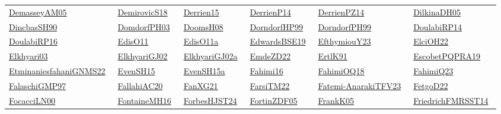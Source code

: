 \begin{longtable}{*{6}{l}}
\href{}{DemasseyAM05}~\cite{DemasseyAM05} & \href{works/DemirovicS18.pdf}{DemirovicS18}~\cite{DemirovicS18} & \href{works/Derrien15.pdf}{Derrien15}~\cite{Derrien15} & \href{works/DerrienP14.pdf}{DerrienP14}~\cite{DerrienP14} & \href{works/DerrienPZ14.pdf}{DerrienPZ14}~\cite{DerrienPZ14} & \href{works/DilkinaDH05.pdf}{DilkinaDH05}~\cite{DilkinaDH05}\\ 
\href{works/DincbasSH90.pdf}{DincbasSH90}~\cite{DincbasSH90} & \href{}{DomdorfPH03}~\cite{DomdorfPH03} & \href{works/DoomsH08.pdf}{DoomsH08}~\cite{DoomsH08} & \href{}{DorndorfHP99}~\cite{DorndorfHP99} & \href{}{DorndorfPH99}~\cite{DorndorfPH99} & \href{works/DoulabiRP14.pdf}{DoulabiRP14}~\cite{DoulabiRP14}\\ 
\href{works/DoulabiRP16.pdf}{DoulabiRP16}~\cite{DoulabiRP16} & \href{works/EdisO11.pdf}{EdisO11}~\cite{EdisO11} & \href{}{EdisO11a}~\cite{EdisO11a} & \href{}{EdwardsBSE19}~\cite{EdwardsBSE19} & \href{works/EfthymiouY23.pdf}{EfthymiouY23}~\cite{EfthymiouY23} & \href{}{ElciOH22}~\cite{ElciOH22}\\ 
\href{works/Elkhyari03.pdf}{Elkhyari03}~\cite{Elkhyari03} & \href{works/ElkhyariGJ02.pdf}{ElkhyariGJ02}~\cite{ElkhyariGJ02} & \href{works/ElkhyariGJ02a.pdf}{ElkhyariGJ02a}~\cite{ElkhyariGJ02a} & \href{works/EmdeZD22.pdf}{EmdeZD22}~\cite{EmdeZD22} & \href{works/ErtlK91.pdf}{ErtlK91}~\cite{ErtlK91} & \href{works/EscobetPQPRA19.pdf}{EscobetPQPRA19}~\cite{EscobetPQPRA19}\\ 
\href{works/EtminaniesfahaniGNMS22.pdf}{EtminaniesfahaniGNMS22}~\cite{EtminaniesfahaniGNMS22} & \href{works/EvenSH15.pdf}{EvenSH15}~\cite{EvenSH15} & \href{works/EvenSH15a.pdf}{EvenSH15a}~\cite{EvenSH15a} & \href{works/Fahimi16.pdf}{Fahimi16}~\cite{Fahimi16} & \href{works/FahimiOQ18.pdf}{FahimiOQ18}~\cite{FahimiOQ18} & \href{}{FahimiQ23}~\cite{FahimiQ23}\\ 
\href{works/FalaschiGMP97.pdf}{FalaschiGMP97}~\cite{FalaschiGMP97} & \href{works/FallahiAC20.pdf}{FallahiAC20}~\cite{FallahiAC20} & \href{works/FanXG21.pdf}{FanXG21}~\cite{FanXG21} & \href{works/FarsiTM22.pdf}{FarsiTM22}~\cite{FarsiTM22} & \href{}{Fatemi-AnarakiTFV23}~\cite{Fatemi-AnarakiTFV23} & \href{works/FetgoD22.pdf}{FetgoD22}~\cite{FetgoD22}\\ 
\href{works/FocacciLN00.pdf}{FocacciLN00}~\cite{FocacciLN00} & \href{works/FontaineMH16.pdf}{FontaineMH16}~\cite{FontaineMH16} & \href{works/ForbesHJST24.pdf}{ForbesHJST24}~\cite{ForbesHJST24} & \href{works/FortinZDF05.pdf}{FortinZDF05}~\cite{FortinZDF05} & \href{works/FrankK05.pdf}{FrankK05}~\cite{FrankK05} & \href{}{FriedrichFMRSST14}~\cite{FriedrichFMRSST14}\\ 

\end{longtable}
